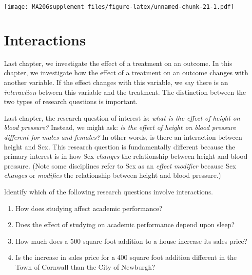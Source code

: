 \documentclass[
]{book}
\newenvironment{Shaded}{\begin{snugshade}}{\end{snugshade}}
\newcommand{\FunctionTok}[1]{\textcolor[rgb]{0.00,0.00,0.00}{#1}}
\newcommand{\NormalTok}[1]{#1}
\newcommand{\SpecialCharTok}[1]{\textcolor[rgb]{0.00,0.00,0.00}{#1}}
\begin{document}
\begin{Shaded}
\end{Shaded}

\texttt{[image: MA206supplement\_files/figure-latex/unnamed-chunk-21-1.pdf]}

\hypertarget{interactions}{%
\chapter{Interactions}\label{interactions}}

Last chapter, we investigate the effect of a treatment on an outcome. In this chapter, we investigate how the effect of a treatment on an outcome changes with another variable. If the effect changes with this variable, we say there is an \emph{interaction} between this variable and the treatment. The distinction between the two types of research questions is important.

Last chapter, the research question of interest is: \emph{what is the effect of height on blood pressure?} Instead, we might ask: \emph{is the effect of height on blood pressure different for males and females?} In other words, is there an interaction between height and Sex. This research question is fundamentally different because the primary interest is in how Sex \emph{changes} the relationship between height and blood pressure. (Note some disciplines refer to Sex as an \emph{effect modifier} because Sex \emph{changes} or \emph{modifies} the relationship between height and blood pressure.)

Identify which of the following research questions involve interactions.

\begin{enumerate}
\def\labelenumi{\alph{enumi})}
\item
  How does studying affect academic performance?
\item
  Does the effect of studying on academic performance depend upon sleep?
\item
  How much does a 500 square foot addition to a house increase its sales price?
\item
  Is the increase in sales price for a 400 square foot addition different in the Town of Cornwall than the City of Newburgh?
\end{enumerate}
\end{document}

